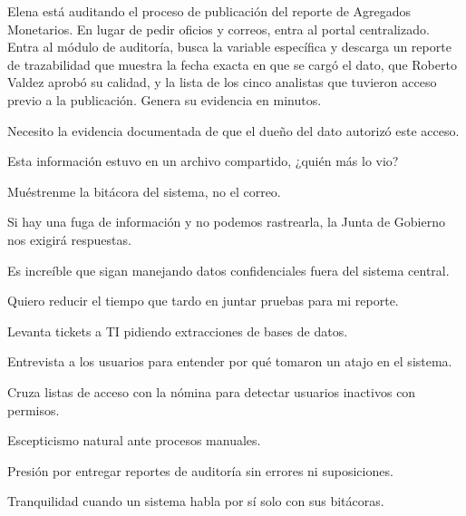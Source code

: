 \begin{uxlist}
\end{uxlist}

Elena está auditando el proceso de publicación del reporte de Agregados Monetarios. En lugar
de pedir oficios y correos, entra al portal centralizado. Entra al módulo de auditoría, busca
la variable específica y descarga un reporte de trazabilidad que muestra la fecha exacta en
que se cargó el dato, que Roberto Valdez aprobó su calidad, y la lista de los cinco analistas
que tuvieron acceso previo a la publicación. Genera su evidencia en minutos.

  {\item Necesito la evidencia documentada de que el dueño del dato autorizó este acceso.
   \item Esta información estuvo en un archivo compartido, ¿quién más lo vio?
   \item Muéstrenme la bitácora del sistema, no el correo.}
  {\item Si hay una fuga de información y no podemos rastrearla, la Junta de Gobierno nos
     exigirá respuestas.
   \item Es increíble que sigan manejando datos confidenciales fuera del sistema central.
   \item Quiero reducir el tiempo que tardo en juntar pruebas para mi reporte.}
  {\item Levanta tickets a TI pidiendo extracciones de bases de datos.
   \item Entrevista a los usuarios para entender por qué tomaron un atajo en el sistema.
   \item Cruza listas de acceso con la nómina para detectar usuarios inactivos con permisos.}
  {\item Escepticismo natural ante procesos manuales.
   \item Presión por entregar reportes de auditoría sin errores ni suposiciones.
   \item Tranquilidad cuando un sistema habla por sí solo con sus bitácoras.}

\clearpage
